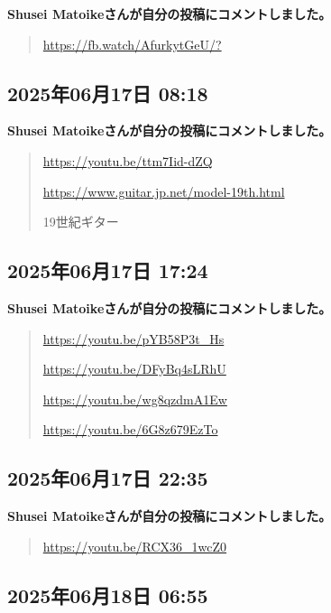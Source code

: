 \textbf{Shusei Matoikeさんが自分の投稿にコメントしました。}

\begin{quote}
\url{https://fb.watch/AfurkytGeU/?}
\end{quote}

\subsection*{2025年06月17日 08:18}

\textbf{Shusei Matoikeさんが自分の投稿にコメントしました。}

\begin{quote}
\url{https://youtu.be/ttm7Iid-dZQ}

\url{https://www.guitar.jp.net/model-19th.html}

19世紀ギター
\end{quote}

\subsection*{2025年06月17日 17:24}

\textbf{Shusei Matoikeさんが自分の投稿にコメントしました。}

\begin{quote}
\url{https://youtu.be/pYB58P3t_Hs}

\url{https://youtu.be/DFyBq4sLRhU}

\url{https://youtu.be/wg8qzdmA1Ew}

\url{https://youtu.be/6G8z679EzTo}
\end{quote}

\subsection*{2025年06月17日 22:35}

\textbf{Shusei Matoikeさんが自分の投稿にコメントしました。}

\begin{quote}
\url{https://youtu.be/RCX36_1wcZ0}
\end{quote}

\subsection*{2025年06月18日 06:55}

